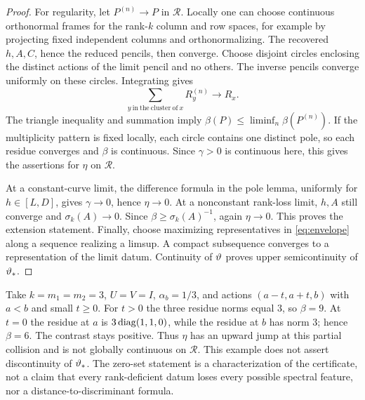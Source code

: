 \begin{proof}
For regularity, let $P^{(n)}\to P$ in $\mathcal R$. Locally one can
choose continuous orthonormal frames for the rank-$k$ column and row
spaces, for example by projecting fixed independent columns and
orthonormalizing. The recovered $h,A,C$, hence the reduced pencils,
then converge. Choose disjoint circles enclosing the distinct actions
of the limit pencil and no others. The inverse pencils converge
uniformly on these circles. Integrating gives
\[
 \sum_{y\ \mathrm{in\ the\ cluster\ of}\ x}R_y^{(n)}\longrightarrow R_x.
\]
The triangle inequality and summation imply
$\beta(P)\le\liminf_n\beta(P^{(n)})$. If the multiplicity pattern
is fixed locally, each circle contains one distinct pole, so each
residue converges and $\beta$ is continuous. Since $\gamma>0$ is
continuous here, this gives the assertions for $\eta$ on $\mathcal R$.

At a constant-curve limit, the difference formula in the pole lemma,
uniformly for $h\in[L,D]$, gives $\gamma\to0$, hence $\eta\to0$.
At a nonconstant rank-loss limit, $h,A$ still converge and
$\sigma_k(A)\to0$. Since $\beta\ge\sigma_k(A)^{-1}$, again
$\eta\to0$. This proves the extension statement. Finally, choose
maximizing representatives in \eqref{eq:envelope} along a sequence
realizing a limsup. A compact subsequence converges to a representation
of the limit datum. Continuity of $\vartheta$ proves upper semicontinuity
of $\vartheta_*$.
\end{proof}

\begin{remark}
Take $k=m_1=m_2=3$, $U=V=I$, $\alpha_b=1/3$, and actions
$(a-t,a+t,b)$ with $a<b$ and small $t\ge0$. For $t>0$ the three
residue norms equal $3$, so $\beta=9$. At $t=0$ the residue at $a$
is $3\operatorname{diag}(1,1,0)$, while the residue at $b$ has norm $3$; hence
$\beta=6$. The contrast stays positive. Thus $\eta$ has an upward
jump at this partial collision and is not globally continuous on
$\mathcal R$. This example does not assert discontinuity of
$\vartheta_*$. The zero-set statement is a characterization of the
certificate, not a claim that every rank-deficient datum loses every
possible spectral feature, nor a distance-to-discriminant formula.
\end{remark}

